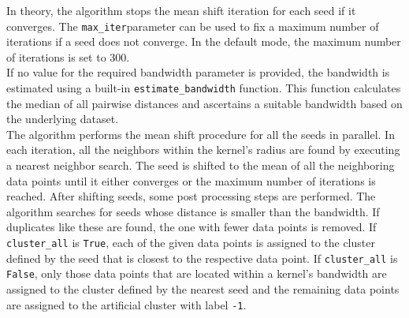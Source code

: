 In theory, the algorithm stops the mean shift iteration for each seed if it converges. The \texttt{max_iter}parameter can be used to fix a maximum number of iterations if a seed does not converge. In the default mode, the maximum number of iterations is set to 300.\\
If no value for the required bandwidth parameter is provided, the bandwidth is estimated using a built-in \texttt{estimate_bandwidth} function. This function calculates the median of all pairwise distances and ascertains a suitable bandwidth based on the underlying dataset.\\

The algorithm performs the mean shift procedure for all the seeds in parallel. In each iteration, all the neighbors within the kernel's radius are found by executing a nearest neighbor search. The seed is shifted to the mean of all the neighboring data points until it either converges or the maximum number of iterations is reached. 
After shifting seeds, some post processing steps are performed. The algorithm searches for seeds whose distance is smaller than the bandwidth. If duplicates like these are found, the one with fewer data points is removed. If \texttt{cluster_all} is \texttt{True}, each of the given data points is assigned to the cluster defined by the seed that is closest to the respective data point. If \texttt{cluster_all} is \texttt{False}, only those data points that are located within a kernel's bandwidth are assigned to the cluster defined by the nearest seed and the remaining data points are assigned to the artificial cluster with label \texttt{-1}.

